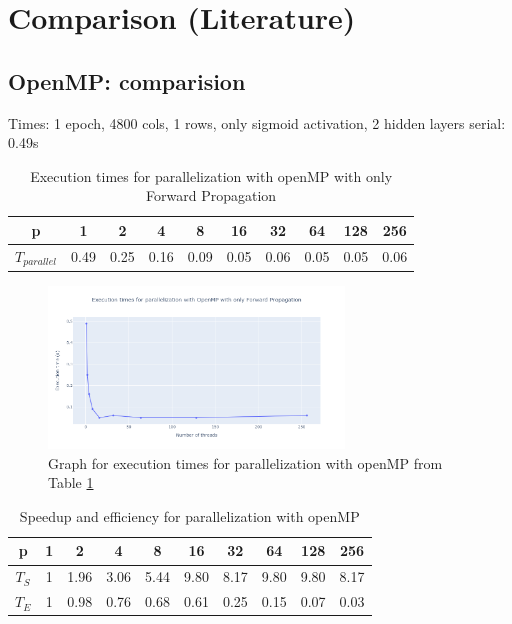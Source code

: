 \documentclass[11pt]{article}
\begin{document}
\section{Comparison (Literature)}

\subsection{OpenMP: comparision}

Times:
1 epoch, 4800 cols, 1 rows, only sigmoid activation, 2 hidden layers
serial:
0.49s

\begin{table}[H]
\centering
\begin{tabular}{|c|c|c|c|c|c|c|c|c|c|}
\hline
 p & 1 & 2 & 4 & 8 & 16 & 32 & 64 & 128 & 256 \\ \hline
 $T_{parallel}$ & 0.49 & 0.25 & 0.16 & 0.09 & 0.05 & 0.06 & 0.05 & 0.05 & 0.06  \\ \hline
\end{tabular}
\caption{Execution times for parallelization with openMP with only Forward Propagation} \label{timeopenMPcomparision}
\end{table}

\begin{figure}[H]
    \centering
    \includegraphics[width=0.7\textwidth]{Plots/exec_openMP_comp.png}
    \caption{Graph for execution times for parallelization with openMP from Table \ref{timeopenMPcomparision}}
    \label{fig:exec_openMP_comp}
\end{figure}

\begin{table}[H]
\centering
\begin{tabular}{|c|c|c|c|c|c|c|c|c|c|}
\hline
 p      & 1 & 2 & 4 & 8 & 16 & 32 & 64 & 128 & 256 \\ \hline
 $T_{S}$ & 1 & 1.96 & 3.06 & 5.44 & 9.80 & 8.17 & 9.80 & 9.80 & 8.17  \\ \hline
 $T_{E}$  & 1 & 0.98 & 0.76 & 0.68 & 0.61 & 0.25 & 0.15 & 0.07 & 0.03 \\ \hline
\end{tabular}
\caption{Speedup and efficiency for parallelization with openMP} \label{speedupompcomp}
\end{table}
\end{document}
